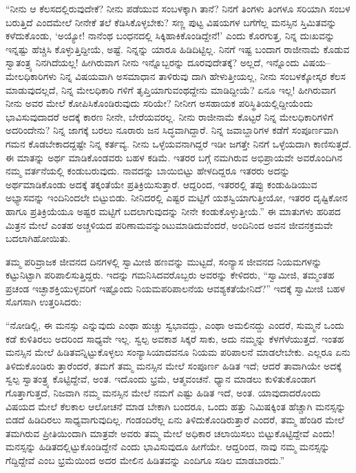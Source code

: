 “ನೀನು ಆ ಕೆಲಸದಲ್ಲಿರುವುದೇಕೆ? ನೀನು ಪಡೆಯುವ ಸಂಬಳಕ್ಕಾಗಿ ತಾನೆ? ನಿನಗೆ ತಿಂಗಳು ತಿಂಗಳೂ ಸರಿಯಾಗಿ ಸಂಬಳ ಬರುತ್ತಿದೆ ಎಂದಮೇಲೆ ನೀನೇಕೆ ತಲೆ ಕೆಡಿಸಿಕೊಳ್ಳಬೇಕು? ಸಣ್ಣ ಪುಟ್ಟ ವಿಷಯಗಳ ಬಗೆಗೆಲ್ಲ ಮನಸ್ಸಿನ ಸ್ತಿಮಿತವನ್ನು ಕಳೆದುಕೊಂಡು, ‘ಅಯ್ಯೋ! ನಾನೆಂಥ ಬಂಧನದಲ್ಲಿ ಸಿಕ್ಕಿಹಾಕಿಕೊಂಡಿದ್ದೇನೆ!’ ಎಂದು ಕೊರಗುತ್ತ, ನಿನ್ನ ದುಃಖವನ್ನು ಇನ್ನಷ್ಟು ಹೆಚ್ಚಿಸಿ ಕೊಳ್ಳುತ್ತಿದ್ದೀಯೆ, ಅಷ್ಟೆ. ನಿನ್ನನ್ನು ಯಾರೂ ಹಿಡಿದಿಟ್ಟಿಲ್ಲ. ನಿನಗೆ ಇಷ್ಟ ಬಂದಾಗ ರಾಜೀನಾಮೆ ಕೊಡುವ ಸ್ವಾತಂತ್ರ್ಯ ನಿನಗಿದೆಯಲ್ಲ! ಹೀಗಿರುವಾಗ ನೀನು ಇನ್ನೊಬ್ಬರನ್ನು ದೂರವುದೇತಕ್ಕೆ? ಅಲ್ಲದೆ, ಇನ್ನೊಂದು ವಿಷಯ–ಮೇಲಧಿಕಾರಿಗಳು ನಿನ್ನ ವಿಷಯವಾಗಿ ಅಸಮಾಧಾನ ತಾಳಿರುವು ದಾಗಿ ಹೇಳುತ್ತೀಯಲ್ಲ, ನೀನು ಸಂಬಳಕ್ಕೋಸ್ಕರ ಕೆಲಸ ಮಾಡುವುದಲ್ಲದೆ, ನಿನ್ನ ಮೇಲಧಿಕಾರಿ ಗಳಿಗೆ ತೃಪ್ತಿಯಾಗುವಂಥದ್ದೇನು ಮಾಡಿದ್ದೀಯೆ? ಏನೂ ಇಲ್ಲ! ಹೀಗಿರುವಾಗ ನೀನು ಅವರ ಮೇಲೆ ಕೋಪಿಸಿಕೊಂಡಿರುವುದು ಸರಿಯೇ? ನೀನೀಗ ಅಸಹಾಯಕ ಪರಿಸ್ಥಿತಿಯಲ್ಲಿದ್ದೀಯೆಂದು ಭಾವಿಸುವುದಾದರೆ ಅದಕ್ಕೆ ಕಾರಣ ನೀನೇ, ಬೇರೆಯವರಲ್ಲ. ನೀನು ರಾಜೀನಾಮೆ ಕೊಟ್ಟರೆ ನಿನ್ನ ಮೇಲಧಿಕಾರಿಗಳಿಗೆ ಅದರಿಂದೇನು? ನಿನ್ನ ಜಾಗಕ್ಕೆ ಬರಲು ನೂರಾರು ಜನ ಸಿದ್ಧವಾಗಿದ್ದಾರೆ. ನಿನ್ನ ಜವಾಬ್ದಾರಿಗಳ ಕಡೆಗೆ ಸಂಪೂರ್ಣವಾಗಿ ಗಮನ ಕೊಡಬೇಕಾದದ್ದಷ್ಟೇ ನಿನ್ನ ಕರ್ತವ್ಯ. ನೀನು ಒಳ್ಳೆಯವನಾಗಿದ್ದರೆ ಇಡೀ ಜಗತ್ತೇ ನಿನಗೆ ಒಳ್ಳೆಯದಾಗಿ ಕಾಣಿಸುತ್ತದೆ. ಈ ಮಾತನ್ನು ಅರ್ಥ ಮಾಡಿಕೊಂಡವರು ಬಹಳ ಕಡಿಮೆ. ಇತರರ ಬಗ್ಗೆ ನಮಗಿರುವ ಅಭಿಪ್ರಾಯವೇ ಅವರೊಂದಿಗಿನ ನಮ್ಮ ವರ್ತನೆಯಲ್ಲಿ ಕಂಡುಬರುವುದು. ನಾವದನ್ನು ಬಾಯಿಬಿಟ್ಟು ಹೇಳದಿದ್ದರೂ ಇತರರು ಅದನ್ನು ಅರ್ಥಮಾಡಿಕೊಂಡು ಅದಕ್ಕೆ ತಕ್ಕಂತೆಯೇ ಪ್ರತಿಕ್ರಿಯಿಸುತ್ತಾರೆ. ಆದ್ದರಿಂದ, ಇತರರಲ್ಲಿ ತಪ್ಪು ಕಂಡುಹಿಡಿಯುವ ಅಭ್ಯಾಸವನ್ನು ಇಂದಿನಿಂದಲೇ ಬಿಟ್ಟುಬಿಡು. ನೀನಿದರಲ್ಲಿ ಎಷ್ಟರ ಮಟ್ಟಿಗೆ ಯಶಸ್ವಿಯಾಗುತ್ತೀಯೋ, ಇತರರ ದೃಷ್ಟಿಕೋನ ಹಾಗೂ ಪ್ರತಿಕ್ರಿಯೆಯೂ ಅಷ್ಟರ ಮಟ್ಟಿಗೆ ಬದಲಾಗುವುದನ್ನು ನೀನೇ ಕಂಡುಕೊಳ್ಳುತ್ತೀಯೆ.” ಈ ಮಾತುಗಳು ಹರಿಪದ ಮಿತ್ರನ ಮೇಲೆ ಎಂತಹ ಅಚ್ಚಳಿಯದ ಪರಿಣಾಮವನ್ನುಂಟುಮಾಡಿದುವೆಂದರೆ, ಅಂದಿನಿಂದ ಅವನ ಜೀವನಕ್ರಮವೇ ಬದಲಾಗಿಹೋಯಿತು.

ತಮ್ಮ ಪರಿವ್ರಾಜಕ ಜೀವನದ ದಿನಗಳಲ್ಲಿ ಸ್ವಾಮೀಜಿ ಹಣವನ್ನು ಮುಟ್ಟದೆ, ಸಂನ್ಯಾಸ ಜೀವನದ ನಿಯಮಗಳನ್ನು ಕಟ್ಟುನಿಟ್ಟಾಗಿ ಪರಿಪಾಲಿಸುತ್ತಿದ್ದರು. ಇದನ್ನು ಗಮನಿಸಿದವರೊಬ್ಬರು ಅವರನ್ನು ಕೇಳಿದರು, “ಸ್ವಾಮೀಜಿ, ತಮ್ಮಂತಹ ಪ್ರಚಂಡ ಇಚ್ಛಾಶಕ್ತಿಯುಳ್ಳವರಿಗೆ ಇಷ್ಟೊಂದು ನಿಯಮಪರಿಪಾಲನೆಯ ಆವಶ್ಯಕತೆಯೇನಿದೆ?” ಇದಕ್ಕೆ ಸ್ವಾಮೀಜಿ ಬಹಳ ಸೊಗಸಾಗಿ ಉತ್ತರಿಸಿದರು:

“ನೋಡಿಲ್ಲಿ, ಈ ಮನಸ್ಸು ಎನ್ನುವುದು ಎಂಥಾ ಹುಚ್ಚು ಸ್ವಭಾವದ್ದು, ಎಂಥಾ ಅಮಲಿನದ್ದು ಎಂದರೆ, ಸುಮ್ಮನೆ ಒಂದು ಕಡೆ ಕುಳಿತಿರಲು ಅದರಿಂದ ಸಾಧ್ಯವೇ ಇಲ್ಲ. ಸ್ವಲ್ಪ ಅವಕಾಶ ಸಿಕ್ಕರೆ ಸಾಕು, ಅದು ನಮ್ಮನ್ನು ಕೆಳಗೆಳೆಯುತ್ತದೆ. ಇಂತಹ ಮನಸ್ಸಿನ ಮೇಲೆ ಹಿಡಿತವನ್ನಿಟ್ಟುಕೊಳ್ಳಲು ಸಂನ್ಯಾಸಿಯಾದವನೂ ನಿಯಮ ಪರಿಪಾಲನೆ ಮಾಡಲೇಬೇಕು. ಎಲ್ಲರೂ ಏನು ತಿಳಿದುಕೊಂಡಿರು ತ್ತಾರೆಂದರೆ, ತಮಗೆ ತಮ್ಮ ಮನಸ್ಸಿನ ಮೇಲೆ ಸಂಪೂರ್ಣ ಹಿಡಿತ ಇದೆ; ಆದರೆ ತಾವಾಗಿಯೇ ಅದಕ್ಕೆ ಸ್ವಲ್ಪ ಸ್ವಾತಂತ್ರ್ಯ ಕೊಟ್ಟಿದ್ದೇವೆ, ಅಂತ. ಇದೊಂದು ಭ್ರಮೆ, ಆತ್ಮವಂಚನೆ. ಧ್ಯಾನ ಮಾಡಲು ಕುಳಿತುಕೊಂಡಾಗ ಗೊತ್ತಾಗುತ್ತದೆ, ನಿಜವಾಗಿ ನಮ್ಮ ಮನಸ್ಸಿನ ಮೇಲೆ ನಮಗೆ ಎಷ್ಟು ಹಿಡಿತ ಇದೆ, ಅಂತ. ಯಾವುದಾದರೊಂದು ವಿಷಯದ ಮೇಲೆ ಕೆಲಕಾಲ ಆಲೋಚನೆ ಮಾಡ ಬೇಕಾಗಿ ಬಂದರೂ, ಒಂದು ಹತ್ತು ನಿಮಿಷಕ್ಕಿಂತ ಹೆಚ್ಚಾಗಿ ಮನಸ್ಸನ್ನು ಬಿಡದೆ ಹಿಡಿದಿರಲು ಸಾಧ್ಯವಾಗುವುದಿಲ್ಲ. ಗಂಡಂದಿರೆಲ್ಲ ಏನು ತಿಳಿದುಕೊಂಡಿರುತ್ತಾರೆ ಎಂದರೆ, ತಮ್ಮ ಹೆಂಡಿರ ಮೇಲೆ ತಮಗಿರುವ ಪ್ರೀತಿಯಿಂದಾಗಿ ಮಾತ್ರವೇ ಅವರು ತಮ್ಮ ಮೇಲೆ ಅಧಿಕಾರ ಚಲಾಯಿಸಲು ಬಿಟ್ಟುಕೊಟ್ಟಿದ್ದೇವೆ ಎಂದು! ಮನಸ್ಸನ್ನು ಹಿಡಿತದಲ್ಲಿಟ್ಟುಕೊಂಡಿದ್ದೇನೆ ಎಂದು ಭಾವಿಸುವುದೂ ಹೀಗೆಯೇ. ಆದ್ದರಿಂದ, ನಾವು ನಮ್ಮ ಮನಸ್ಸನ್ನು ಗೆದ್ದಿದ್ದೇವೆ ಎಂಬ ಭ್ರಮೆಯಿಂದ ಅದರ ಮೇಲಿನ ಹಿಡಿತವನ್ನು ಎಂದಿಗೂ ಸಡಿಲ ಮಾಡಬಾರದು.”

